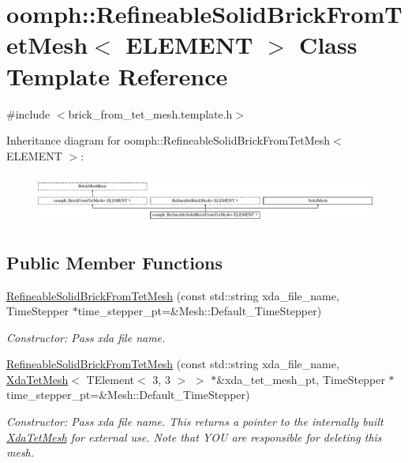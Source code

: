 \hypertarget{classoomph_1_1RefineableSolidBrickFromTetMesh}{}\section{oomph\+:\+:Refineable\+Solid\+Brick\+From\+Tet\+Mesh$<$ E\+L\+E\+M\+E\+NT $>$ Class Template Reference}
\label{classoomph_1_1RefineableSolidBrickFromTetMesh}


{\ttfamily \#include $<$brick\+\_\+from\+\_\+tet\+\_\+mesh.\+template.\+h$>$}

Inheritance diagram for oomph\+:\+:Refineable\+Solid\+Brick\+From\+Tet\+Mesh$<$ E\+L\+E\+M\+E\+NT $>$\+:\begin{figure}[H]
\begin{center}
\leavevmode
\includegraphics[height=1.651917cm]{classoomph_1_1RefineableSolidBrickFromTetMesh}
\end{center}
\end{figure}
\subsection*{Public Member Functions}
\begin{DoxyCompactItemize}
\item 
\hyperlink{classoomph_1_1RefineableSolidBrickFromTetMesh_a21676e62a225b6d698af7a58de4e3553}{Refineable\+Solid\+Brick\+From\+Tet\+Mesh} (const std\+::string xda\+\_\+file\+\_\+name, Time\+Stepper $\ast$time\+\_\+stepper\+\_\+pt=\&Mesh\+::\+Default\+\_\+\+Time\+Stepper)
\begin{DoxyCompactList}\small\item\em Constructor\+: Pass xda file name. \end{DoxyCompactList}\item 
\hyperlink{classoomph_1_1RefineableSolidBrickFromTetMesh_a178ef2547dfaa31b2f88e50b26315d00}{Refineable\+Solid\+Brick\+From\+Tet\+Mesh} (const std\+::string xda\+\_\+file\+\_\+name, \hyperlink{classoomph_1_1XdaTetMesh}{Xda\+Tet\+Mesh}$<$ T\+Element$<$ 3, 3 $>$ $>$ $\ast$\&xda\+\_\+tet\+\_\+mesh\+\_\+pt, Time\+Stepper $\ast$time\+\_\+stepper\+\_\+pt=\&Mesh\+::\+Default\+\_\+\+Time\+Stepper)
\begin{DoxyCompactList}\small\item\em Constructor\+: Pass xda file name. This returns a pointer to the internally built \hyperlink{classoomph_1_1XdaTetMesh}{Xda\+Tet\+Mesh} for external use. Note that Y\+OU are responsible for deleting this mesh. \end{DoxyCompactList}\end{DoxyCompactItemize}


